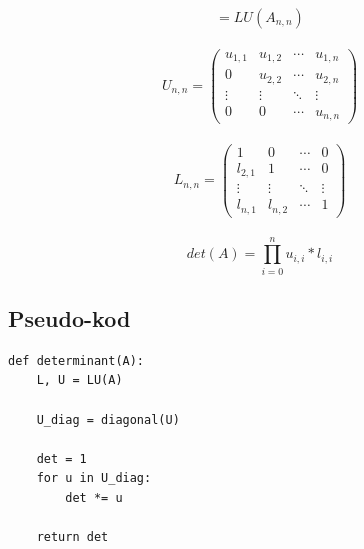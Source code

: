 \documentclass{article}
\begin{document}
\begin{equation}
[ L_{n,n}, U_{n,n} ] = LU(A_{n,n})
\end{equation}\\
\begin{equation}
U_{n,n} = 
 \begin{pmatrix}
  u_{1,1} & u_{1,2} & \cdots & u_{1,n} \\
  0 & u_{2,2} & \cdots & u_{2,n} \\
  \vdots  & \vdots  & \ddots & \vdots  \\
  0 & 0 & \cdots & u_{n,n} 
 \end{pmatrix}
\end{equation}\\
\begin{equation}
L_{n,n} = 
 \begin{pmatrix}
  1 & 0 & \cdots & 0 \\
  l_{2,1} & 1 & \cdots & 0 \\
  \vdots  & \vdots  & \ddots & \vdots  \\
  l_{n,1}  & l_{n,2}  & \cdots & 1 
 \end{pmatrix}
\end{equation}\\
\begin{equation}
det(A) = \prod_{i = 0}^{n} u_{i, i} * l_{i, i}
\end{equation}

\subsection{Pseudo-kod}
\begin{lstlisting}
def determinant(A):
    L, U = LU(A)

    U_diag = diagonal(U)

    det = 1
    for u in U_diag:
        det *= u
        
    return det
\end{lstlisting}
\end{document}
